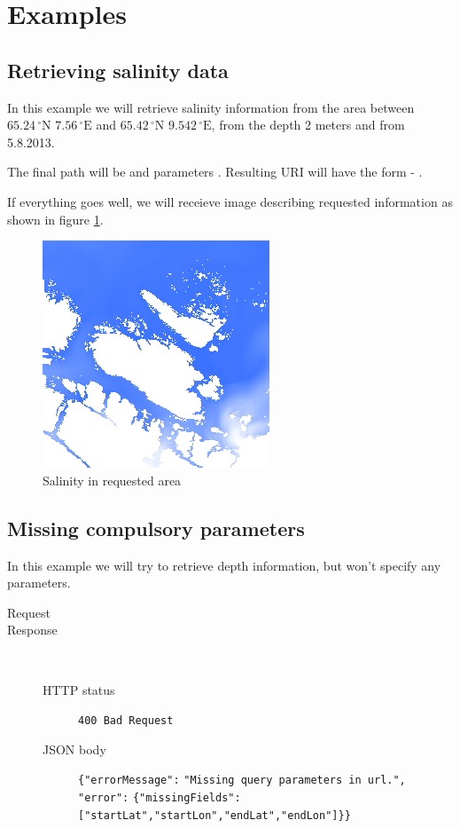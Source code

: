 \documentclass[11pt,a4paper,titlepage,oneside]{report}
\begin{document}
\section{Examples}

\subsection{Retrieving salinity data}
\label{subsec:rest_example_salinity}
In this example we will retrieve salinity information from the area between $65.24\,^{\circ}\mathrm{N}$ $7.56\,^{\circ}\mathrm{E}$ and $65.42\,^{\circ}\mathrm{N}$ $9.542\,^{\circ}\mathrm{E}$, from the depth 2 meters and from 5.8.2013.

The final path will be  and parameters . Resulting URI will have the form - .

If everything goes well, we will receieve image describing requested information as shown in figure \ref{fig:rest_example_1}.

\begin{figure}[h]
	\centering
	\includegraphics{img/REST_example_1.png}
	\caption{Salinity in requested area}
	\label{fig:rest_example_1}
\end{figure}

\subsection{Missing compulsory parameters}
In this example we will try to retrieve depth information, but won't specify any parameters.

\begin{description}
	\item[Request] 
	\item[Response] ~\\
		\begin{description}
			\item[\gls{HTTP} status] \texttt{400 Bad Request}
			\item[\gls{JSON} body] \texttt{\{"errorMessage":} \texttt{"Missing~query~parameters~in~url.",} \texttt{"error":} \texttt{\{"missingFields":} \texttt{["startLat","startLon","endLat","endLon"]\}\}}
		\end{description}
\end{description}
\end{document}

